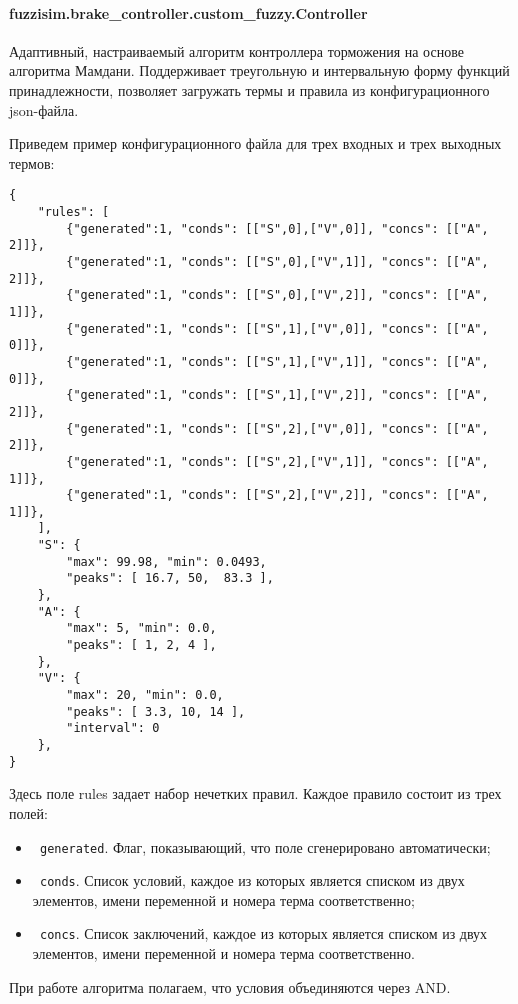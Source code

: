 \paragraph{fuzzisim.brake\_controller.custom\_fuzzy.Controller}
Адаптивный, настраиваемый алгоритм контроллера торможения на основе алгоритма Мамдани. Поддерживает треугольную и интервальную форму функций принадлежности, позволяет загружать термы и правила из конфигурационного json-файла.

Приведем пример конфигурационного файла для трех входных и трех выходных термов:
\begin{lstlisting}[style=pythonstyle,caption={  }, label=lst:func:1]
{
    "rules": [
        {"generated":1, "conds": [["S",0],["V",0]], "concs": [["A", 2]]},
        {"generated":1, "conds": [["S",0],["V",1]], "concs": [["A", 2]]},
        {"generated":1, "conds": [["S",0],["V",2]], "concs": [["A", 1]]},
        {"generated":1, "conds": [["S",1],["V",0]], "concs": [["A", 0]]},
        {"generated":1, "conds": [["S",1],["V",1]], "concs": [["A", 0]]},
        {"generated":1, "conds": [["S",1],["V",2]], "concs": [["A", 2]]},
        {"generated":1, "conds": [["S",2],["V",0]], "concs": [["A", 2]]},
        {"generated":1, "conds": [["S",2],["V",1]], "concs": [["A", 1]]},
        {"generated":1, "conds": [["S",2],["V",2]], "concs": [["A", 1]]},
    ],
    "S": {
        "max": 99.98, "min": 0.0493,
        "peaks": [ 16.7, 50,  83.3 ],
    },
    "A": {
        "max": 5, "min": 0.0,
        "peaks": [ 1, 2, 4 ],
    },
    "V": {
        "max": 20, "min": 0.0,
        "peaks": [ 3.3, 10, 14 ],
        "interval": 0
    },
}
\end{lstlisting}

Здесь поле rules задает набор нечетких правил. Каждое правило состоит из трех полей:
\begin{itemize}
	\item \lstinline! generated!. Флаг, показывающий, что поле сгенерировано автоматически;
	\item \lstinline! conds!. Список условий, каждое из которых является списком из двух элементов, имени переменной и номера терма соответственно;
	\item \lstinline! concs!. Список заключений, каждое из которых является списком из двух элементов, имени переменной и номера терма соответственно.
\end{itemize}

При работе алгоритма полагаем, что условия объединяются через AND.

